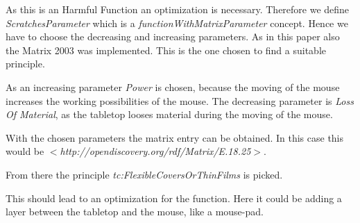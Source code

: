 As this is an Harmful Function an optimization is necessary. 
Therefore we define \textit{ScratchesParameter} which is a \textit{functionWithMatrixParameter} concept. 
Hence we have to choose the decreasing and increasing parameters.
As in this paper also the Matrix 2003 was implemented.
This is the one chosen to find a suitable principle.

As an increasing parameter \textit{Power} is chosen, because the moving of the mouse increases the working possibilities of the mouse. 
The decreasing parameter is \textit{Loss Of Material}, as the tabletop looses material during the moving of the mouse. 

With the chosen parameters the matrix entry can be obtained. 
In this case this would be \textit{$<$http://opendiscovery.org/rdf/Matrix/E.18.25$>$}. 

From there the principle \textit{tc:FlexibleCoversOrThinFilms} is picked.

This should lead to an optimization for the function.
Here it could be adding a layer between the tabletop and the mouse, like a mouse-pad. 
